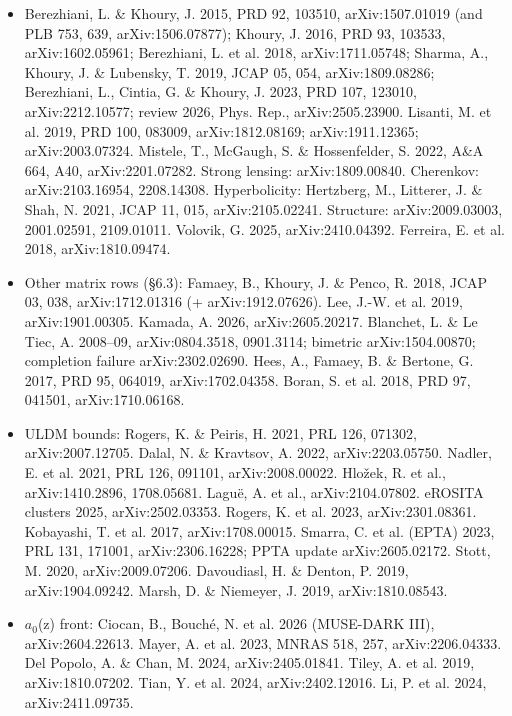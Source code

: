 \documentclass[11pt,a4paper]{article}
\begin{document}
\begin{itemize}
\item Berezhiani, L. \& Khoury, J. 2015, PRD 92, 103510, arXiv:1507.01019 (and PLB 753, 639, arXiv:1506.07877); Khoury, J. 2016, PRD 93, 103533, arXiv:1602.05961; Berezhiani, L. et al. 2018, arXiv:1711.05748; Sharma, A., Khoury, J. \& Lubensky, T. 2019, JCAP 05, 054, arXiv:1809.08286; Berezhiani, L., Cintia, G. \& Khoury, J. 2023, PRD 107, 123010, arXiv:2212.10577; review 2026, Phys. Rep., arXiv:2505.23900. Lisanti, M. et al. 2019, PRD 100, 083009, arXiv:1812.08169; arXiv:1911.12365; arXiv:2003.07324. Mistele, T., McGaugh, S. \& Hossenfelder, S. 2022, A\&A 664, A40, arXiv:2201.07282. Strong lensing: arXiv:1809.00840. Cherenkov: arXiv:2103.16954, 2208.14308. Hyperbolicity: Hertzberg, M., Litterer, J. \& Shah, N. 2021, JCAP 11, 015, arXiv:2105.02241. Structure: arXiv:2009.03003, 2001.02591, 2109.01011. Volovik, G. 2025, arXiv:2410.04392. Ferreira, E. et al. 2018, arXiv:1810.09474.

\item Other matrix rows (\S{}6.3): Famaey, B., Khoury, J. \& Penco, R. 2018, JCAP 03, 038, arXiv:1712.01316 (+ arXiv:1912.07626). Lee, J.-W. et al. 2019, arXiv:1901.00305. Kamada, A. 2026, arXiv:2605.20217. Blanchet, L. \& Le Tiec, A. 2008--09, arXiv:0804.3518, 0901.3114; bimetric arXiv:1504.00870; completion failure arXiv:2302.02690. Hees, A., Famaey, B. \& Bertone, G. 2017, PRD 95, 064019, arXiv:1702.04358. Boran, S. et al. 2018, PRD 97, 041501, arXiv:1710.06168.

\item ULDM bounds: Rogers, K. \& Peiris, H. 2021, PRL 126, 071302, arXiv:2007.12705. Dalal, N. \& Kravtsov, A. 2022, arXiv:2203.05750. Nadler, E. et al. 2021, PRL 126, 091101, arXiv:2008.00022. Hlo\v{z}ek, R. et al., arXiv:1410.2896, 1708.05681. Lagu\"e, A. et al., arXiv:2104.07802. eROSITA clusters 2025, arXiv:2502.03353. Rogers, K. et al. 2023, arXiv:2301.08361. Kobayashi, T. et al. 2017, arXiv:1708.00015. Smarra, C. et al. (EPTA) 2023, PRL 131, 171001, arXiv:2306.16228; PPTA update arXiv:2605.02172. Stott, M. 2020, arXiv:2009.07206. Davoudiasl, H. \& Denton, P. 2019, arXiv:1904.09242. Marsh, D. \& Niemeyer, J. 2019, arXiv:1810.08543.

\item $a_{0}$(z) front: Ciocan, B., Bouch\'e, N. et al. 2026 (MUSE-DARK III), arXiv:2604.22613. Mayer, A. et al. 2023, MNRAS 518, 257, arXiv:2206.04333. Del Popolo, A. \& Chan, M. 2024, arXiv:2405.01841. Tiley, A. et al. 2019, arXiv:1810.07202. Tian, Y. et al. 2024, arXiv:2402.12016. Li, P. et al. 2024, arXiv:2411.09735.


\end{itemize}
\end{document}
